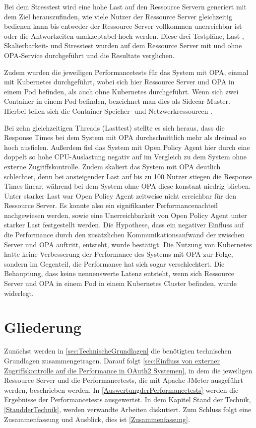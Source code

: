 Bei dem Stresstest wird eine hohe Last auf den Ressource Servern generiert mit dem Ziel herauszufinden, wie viele Nutzer der Ressource Server gleichzeitig bedienen kann bis entweder der Ressource Server vollkommen unerreichbar ist oder die Antwortzeiten unakzeptabel hoch werden. Diese drei Testpläne, Last-, Skalierbarkeit- und Stresstest wurden auf dem Ressource Server mit und ohne OPA-Service durchgeführt und die Resultate verglichen.\smallskip

Zudem wurden die jeweiligen Performancetests für das System mit OPA, einmal mit Kubernetes durchgeführt, wobei sich hier Ressource Server und OPA in einem Pod befinden, als auch ohne Kubernetes durchgeführt. Wenn sich zwei Container in einem Pod befinden, bezeichnet man dies als Sidecar-Muster. Hierbei teilen sich die Container Speicher- und Netzwerkressourcen \citep{sidecar:2017}.\smallskip

Bei zehn gleichzeitigen Threads (Lasttest) stellte es sich heraus, dass die Response Times bei dem System mit OPA durchschnittlich mehr als dreimal so hoch ausfielen. Außerdem fiel das System mit Open Policy Agent hier durch eine doppelt so hohe \ac{CPU}-Auslastung negativ auf im Vergleich zu dem System ohne externe Zugriffskontrolle. Zudem skaliert das System mit \ac*{OPA} deutlich schlechter, denn bei ansteigender Last auf bis zu 100 Nutzer stiegen die Response Times linear, während bei dem System ohne OPA diese konstant niedrig blieben. Unter starker Last war Open Policy Agent zeitweise nicht erreichbar für den Ressource Server. Es konnte also ein signifikanter Performancenachteil nachgewiesen werden, sowie eine Unerreichbarkeit von Open Policy Agent unter starker Last festgestellt werden. Die Hypothese, dass ein negativer Einfluss auf die Performance durch den zusätzlichen Kommunikationsaufwand der zwischen Server und \ac*{OPA} auftritt, entsteht, wurde bestätigt. Die Nutzung von Kubernetes hatte keine Verbesserung der Performance des Systems mit OPA zur Folge, sondern im Gegenteil, die Performance hat sich sogar verschlechtert. Die Behauptung, dass keine nennenswerte Latenz entsteht, wenn sich Ressource Server und OPA in einem Pod in einem Kubernetes Cluster befinden, wurde widerlegt. 

%
%
\section{Gliederung}
\label{sec:intro:structure}
Zunächst werden in \autoref{sec:TechnischeGrundlagen} die benötigten technischen Grundlagen zusammengetragen. Darauf folgt \autoref{sec:Einfluss von externer Zugriffskontrolle auf die Performance in OAuth2 Systemen}, in dem die jeweiligen Ressource Server und die Performancetests, die mit Apache JMeter ausgeführt werden, beschrieben werden. In \autoref{AuswertungderPerformancetests} werden die Ergebnisse der Performancetests ausgewertet. In dem Kapitel Stand der Technik, \autoref{StandderTechnik}, werden verwandte Arbeiten diskutiert. Zum Schluss folgt eine Zusammenfassung und Ausblick, dies ist \autoref{Zusammenfassung}. 
